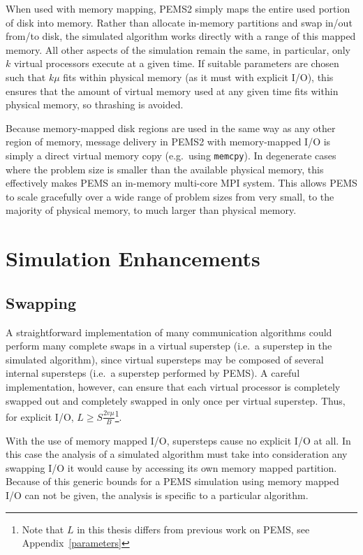 \documentclass[12pt]{carletoncsthesis}
\begin{document}
When used with memory mapping, PEMS2 simply maps the entire used portion
of disk into memory.  Rather than allocate in-memory partitions and swap
in/out from/to disk, the simulated algorithm works directly with a range
of this mapped memory.  All other aspects of the simulation remain the
same, in particular, only $k$ virtual processors execute at a given time.
If suitable parameters are chosen such that $k\mu$ fits within physical memory
(as it must with explicit I/O), this ensures that the amount of virtual memory
used at any given time fits within physical memory, so thrashing is avoided.

Because memory-mapped disk regions are used in the same way as any other
region of memory, message delivery in PEMS2 with memory-mapped I/O is simply
a direct virtual memory copy (e.g.\ using {\tt memcpy}).  In degenerate cases
where the problem size is smaller than the available physical memory, this
effectively makes PEMS an in-memory multi-core MPI system.  This allows PEMS
to scale gracefully over a wide range of problem sizes from very small,
to the majority of physical memory, to much larger than physical memory.



\chapter{Simulation Enhancements}
\thispagestyle{empty}
\label{simulation}


\section{Swapping}


A straightforward implementation of many communication algorithms could perform
many complete swaps in a virtual superstep (i.e.\ a superstep in the simulated
algorithm), since virtual supersteps may be composed of several internal
supersteps (i.e.\ a superstep performed by PEMS).  A careful implementation,
however, can ensure that each virtual processor is completely swapped out and
completely swapped in only once per virtual superstep.  Thus, for explicit
I/O, $L \ge S\frac{2v\mu}{B}$\footnote{Note that $L$ in this thesis differs
from previous work on PEMS, see Appendix~\ref{parameters}}.

With the use of memory mapped I/O, supersteps cause no explicit I/O at all.
In this case the analysis of a simulated algorithm must take into consideration
any swapping I/O it would cause by accessing its own memory mapped partition.
Because of this generic bounds for a PEMS simulation using memory mapped
I/O can not be given, the analysis is specific to a particular algorithm.
\end{document}
